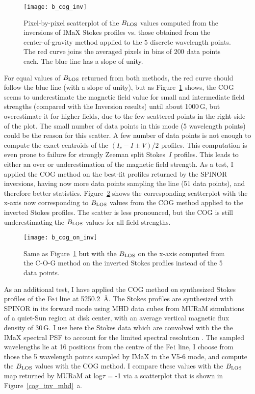 \documentclass[goettingen, gauss, print]{thesis}
\begin{document}
\begin{figure}[h!]
\centering
\texttt{[image: b\_cog\_inv]}
\caption{Pixel-by-pixel scatterplot of the $B_{\rm LOS}$ values computed from the inversions of IMaX Stokes profiles vs. those obtained from the center-of-gravity method applied to the 5 discrete wavelength points. The red curve joins the averaged pixels in bins of 200 data points each. The blue line has a slope of unity.}
\label{cog_inv}
\end{figure}

For equal values of $B_{\rm LOS}$ returned from both methods, the red curve should follow the blue line (with a slope of unity), but as Figure~\ref{cog_inv} shows, the COG seems to underestimate the magnetic field value for small and intermediate field strengths (compared with the Inversion results) until about 1000\,G, but overestimate it for higher fields, due to the few scattered points in the right side of the plot. 
The small number of data points in this mode (5 wavelength points) could be the reason for this scatter. A few number of data points is not enough to compute the exact centroids of the $(I_c-I\pm V)/2$ profiles. This computation is even prone to failure for strongly Zeeman split Stokes~$I$ profiles. This leads to either an over or underestimation of the magnetic field strength.
As a test, I applied the COG method on the best-fit profiles returned by the SPINOR inversions, having now more data points sampling the line (51 data points), and therefore better statistics.
Figure~\ref{cog_on_inv} shows the corresponding scatterplot with the x-axis now corresponding to $B_{\rm LOS}$ values from the COG method applied to the inverted Stokes profiles. The scatter is less pronounced, but the COG is still underestimating the $B_{\rm LOS}$ values for all field strengths.

\begin{figure}[h!]
\centering
\texttt{[image: b\_cog\_on\_inv]}
\caption{Same as Figure~\ref{cog_inv} but with the $B_{\rm LOS}$ on the x-axis computed from the C-O-G method on the inverted Stokes profiles instead of the 5 data points.}
\label{cog_on_inv}
\end{figure}

As an additional test, I have applied the COG method on synthesized Stokes profiles of the Fe\,{\sc i} line at 5250.2\, \AA{}. The Stokes profiles are synthesized with SPINOR in its forward mode using MHD data cubes from MURaM simulations of a quiet-Sun region at disk center, with an average vertical magnetic flux density of $30$\,G. I use here the Stokes data which are convolved with the the IMaX spectral PSF to account for the limited spectral resolution \citep{riethmuller_comparison_2014}. The sampled wavelengths lie at 16 positions from the centre of the Fe\,{\sc i} line, I choose from those the 5 wavelength points sampled by IMaX in the V5-6 mode, and compute the $B_{\rm LOS}$ values with the COG method. 
I compare these values with the $B_{\rm LOS}$ map returned by MURaM at log$\tau$ = -1 via a scatterplot that is shown in Figure~\ref{cog_inv_mhd}~a.
\end{document}
